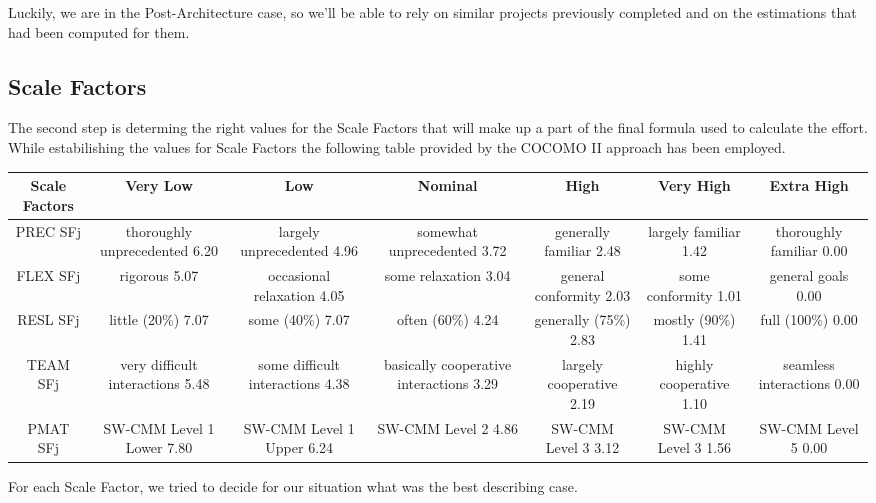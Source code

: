 Luckily, we are in the Post-Architecture case, so we'll be able to rely on similar projects previously completed and on the estimations that had been computed for them.

\subsection{Scale Factors}

The second step is determing the right values for the Scale Factors that will make up a part of the final formula used to calculate the effort. While estabilishing the values for Scale Factors the following table provided by the COCOMO II approach has been employed.

\begin{tabular}{ | c | c | c | c | c | c | c | }
\hline
	\textbf{Scale Factors} & \textbf{Very Low} & \textbf{Low} & \textbf{Nominal} & \textbf{High} & \textbf{Very High} & \textbf{Extra High} \\ \hline
	PREC  SFj  & thoroughly unprecedented 6.20 & largely unprecedented 4.96 & somewhat unprecedented 3.72 & generally familiar 2.48 & largely familiar 1.42 & thoroughly familiar 0.00 \\ \hline
	FLEX SFj  & rigorous 5.07 & occasional relaxation 4.05 & some relaxation 3.04 & general conformity 2.03 & some conformity 1.01 & general goals 0.00 \\ \hline
	RESL SFj  & little (20\%) 7.07 & some (40\%) 7.07 & often (60\%) 4.24 & generally (75\%) 2.83 & mostly
(90\%) 1.41 & full (100\%) 0.00 \\ \hline
	TEAM SFj  & very difficult interactions 5.48 & some difficult interactions 4.38 & basically cooperative interactions 3.29 & largely cooperative 2.19 & highly cooperative 1.10 & seamless interactions 0.00  \\ \hline
	PMAT SFj  & SW-CMM Level 1 Lower 7.80 & SW-CMM Level 1 Upper 6.24 & SW-CMM Level 2 4.86 & SW-CMM Level 3 3.12 & SW-CMM Level 3  1.56 & SW-CMM Level 5  0.00 \\ \hline
\end{tabular}

For each Scale Factor, we tried to decide for our situation what was the best describing case.

